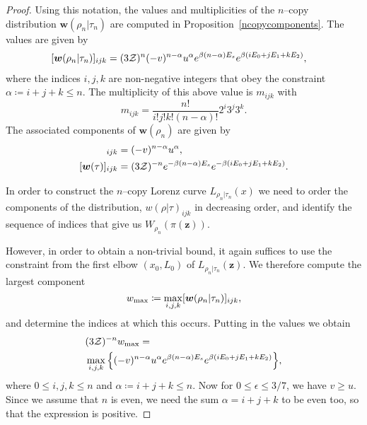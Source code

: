 \documentclass[
twocolumn,
superscriptaddress
]{revtex4-1}
\def\z{\boldsymbol{z}}
\def\w{\boldsymbol{w}}
\def\Z{{\cal Z}}
\begin{document}
\begin{proof}
Using this notation, the values and multiplicities of the $n$--copy distribution $\w(\rho_n |\tau_n)$ are computed in Proposition~\ref{ncopycomponents}. The values are given by 
\begin{align}\label{eq:ncopy_w_rescaled}
	[\w(\rho_n | \tau_n)]_{ijk} &= (3\Z)^{n} (-v)^{n-\alpha} u^{\alpha} e^{\beta (n-\alpha)E_s} e^{\beta ( i E_0 + j E_1 + k E_2 )},
\end{align}
where the indices $i,j,k$ are non-negative integers that obey the constraint $\alpha \coloneqq i+j+k \leq n$.
The multiplicity of this above value is $m_{ijk}$ with
\begin{equation}
	m_{ijk} = \frac{n!}{i!j!k!(n-\alpha)!} 2^i 3^j 3^k.
\end{equation}
The associated components of $\w(\rho_n)$ are given by
\begin{align}
	[\w(\rho_n)]_{ijk} &= (-v)^{n-\alpha} u^{\alpha}, \label{eq:ncopy_wrho}\\
	[\w(\tau)]_{ijk} &= (3\Z)^{-n} e^{-\beta (n-\alpha)E_s} e^{-\beta ( i E_0 + j E_1 + k E_2 )}. \label{eq:ncopy_wsigma}
\end{align}

In order to construct the $n$--copy Lorenz curve $L_{\rho_n|\tau_n}(x)$ we need to order the components of the distribution, $w(\rho | \tau)_{ijk}$ in decreasing order, and identify the sequence of indices that give us $W_{\rho_n}(\pi(\z))$.

However, in order to obtain a non-trivial bound, it again suffices to use the constraint from the first elbow $(x_0, L_0)$ of $L_{\rho_n|\tau_n}(\z)$. We therefore compute the largest component 
\begin{equation}
	w_{\rm max} \coloneqq \max_{i,j,k} [\w(\rho_n | \tau_n)]_{ijk},
\end{equation}
and determine the indices at which this occurs.
Putting in the values we obtain
\begin{align}
	&(3\Z)^{-n}w_{\rm max} = \nonumber\\
	&\max\limits_{i,j,k}\Big\{ (-v)^{n-\alpha} u^{\alpha} e^{\beta (n-\alpha)E_s} e^{\beta ( i E_0 + j E_1 + k E_2 )} \Big\}, \label{eq:max_slope}
\end{align}
where $0 \leq i,j,k \leq n$ and $\alpha \coloneqq i+j+k \leq n$.
Now for $0 \leq \epsilon \leq 3/7$, we have $v \geq u$. Since we assume that $n$ is even, we need the sum $\alpha = i+j+k$ to be even too, so that the expression is positive. 


\end{proof}
\end{document}
